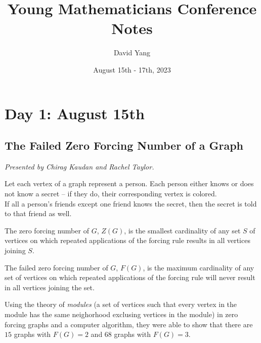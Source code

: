 \documentclass[12pt]{amsart}
\title{Young Mathematicians Conference Notes}
\author{David Yang}
\date{August 15th - 17th, 2023}
\begin{document}
\maketitle

\section{Day 1: August 15th}

\vspace{0.25cm}

\subsection{The Failed Zero Forcing Number of a Graph}

\textit{}
\vspace{0.25cm}

\textit{Presented by Chirag Kaudan and Rachel Taylor.}

\begin{definition}
Let each vertex of a graph represent a person. Each person either knows or does not know a secret -- if they do, their corresponding vertex is colored. \\

If all a person's friends except one friend knows the secret, then the secret is told to that friend as well.\end{definition}

\begin{definition}
The zero forcing number of $G$, $Z(G)$, is the smallest cardinality of any set $S$ of vertices on which repeated applications of the forcing rule
results in all vertices joining $S$.
\end{definition}

\begin{definition}
The failed zero forcing number of $G$, $F(G)$, is the maximum
cardinality of any set of vertices on which repeated applications of the forcing rule will never result in all vertices joining the set.\end{definition}

\begin{result*}
Using the theory of \textit{modules} (a set of vertices such that every vertex in the module has the same neighorhood exclusing vertices in the module) in zero forcing graphs and a computer algorithm, they were able to show that
there are $15$ graphs with $F(G) = 2$ and $68$ graphs with $F(G) = 3$. 
\end{result*}
\end{document}
